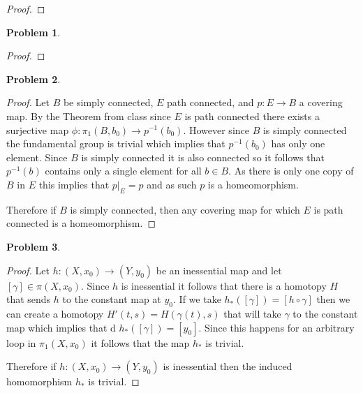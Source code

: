 \documentclass[10pt]{article}
\newcommand{\sk}{\vskip 10mm}
\theoremstyle{plain}
\newtheorem{problem}{Problem}
\theoremstyle{remark}
\begin{document}
\begin{proof}
  
\end{proof}

\sk

\begin{problem} %
  
\end{problem}

\begin{proof}
  
\end{proof}

\sk

\begin{problem} %
  
\end{problem}

\begin{proof}
  Let $B$ be simply connected, $E$ path connected, and $p:E\rightarrow B$ a covering map.
  By the Theorem from class since $E$ is path connected there exists a
  surjective map $\phi:\pi_1(B,b_0)\rightarrow p^{-1}(b_0)$. However since $B$ is simply connected
  the fundamental group is trivial which implies that $p^{-1}(b_0)$ has only one
  element. Since $B$ is simply connected it is also connected so it follows that
  $p^{-1}(b)$ contains only a single element for all $b\in B$. As there is only one
  copy of $B$ in $E$ this implies that $p|_E=p$ and as such $p$ is a homeomorphism.

  Therefore if $B$ is simply connected, then any covering map for which $E$ is
  path connected is a homeomorphism.
\end{proof}

\sk

\begin{problem} %
  
\end{problem}

\begin{proof}
  Let $h:(X,x_0)\rightarrow (Y,y_0)$ be an inessential map and let $[\gamma]\in \pi(X,x_0)$.
  Since $h$ is inessential it follows that there is a homotopy $H$ that
  sends $h$ to the constant map at $y_0$. If we take $h_*([\gamma])=[h\circ\gamma]$
  then we can create a homotopy $H'(t,s)=H(\gamma(t),s)$ that will take $\gamma$
  to the constant map which implies that d $h_*([\gamma])=[y_0]$. Since
  this happens for an arbitrary loop in $\pi_1(X,x_0)$ it follows that
  the map $h_*$ is trivial.

  Therefore if $h:(X,x_0)\rightarrow (Y,y_0)$ is inessential then the induced homomorphism
  $h_*$ is trivial.
\end{proof}
  
\end{document}
